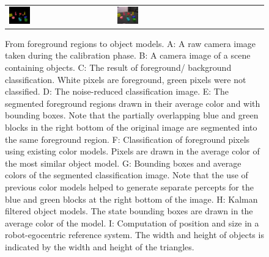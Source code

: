 \begin{figure}[t]
{\begin{tabular}{@{}l@{}p{}@{}l@{}p{}@{}l@{}p{}@{}l@{}p{}@{}l@{}}
      \includegraphics[width=0.23\textwidth]{figures/vision-system-object-perception-7} & &
      \includegraphics[width=0.23\textwidth]{figures/vision-system-object-perception-8} \\
    \end{tabular}}
  \caption{From foreground regions to object models. A: A raw camera
    image taken during the calibration phase. B: A camera image of a
    scene containing objects. C: The result of foreground/ background
    classification. White pixels are foreground, green pixels were not
    classified. D: The noise-reduced classification image. E: The
    segmented foreground regions drawn in their average color and with
    bounding boxes. Note that the partially overlapping blue and green
    blocks in the right bottom of the original image are segmented
    into the same foreground region. F: Classification of foreground
    pixels using existing color models. Pixels are drawn in the
    average color of the most similar object model. G: Bounding boxes
    and average colors of the segmented classification image. Note
    that the use of previous color models helped to generate separate
    percepts for the blue and green blocks at the right bottom of the
    image. H: Kalman filtered object models. The state bounding boxes
    are drawn in the average color of the model. I: Computation of
    position and size in a robot-egocentric reference system. The
    width and height of objects is indicated by the width and height
    of the triangles.}
  \label{f:object-perception}
\end{figure}

